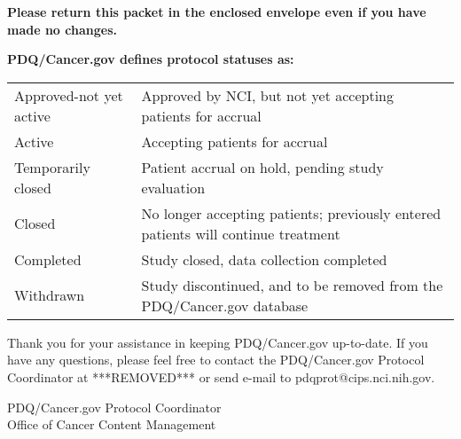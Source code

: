 \documentclass[letterpaper,12pt]{letter}
\begin{document}
\textbf{Please return this packet in the enclosed envelope even if you have
    made no changes.}

\textbf{PDQ/Cancer.gov defines protocol statuses as:}

\begin{longtable}{p{2in}p{4in}}
Approved-not yet active & Approved by NCI, but not yet accepting
                          patients for accrual \\
Active                  & Accepting patients for accrual \\
Temporarily closed      & Patient accrual on hold, pending study evaluation \\
Closed                  & No longer accepting patients; previously entered
                          patients will continue treatment \\
Completed               & Study closed, data collection completed \\
Withdrawn               & Study discontinued, and to be removed from
                          the PDQ/Cancer.gov database
\end{longtable}

Thank you for your assistance in keeping PDQ/Cancer.gov up-to-date.  If you
have any questions, please feel free to contact the PDQ/Cancer.gov Protocol
Coordinator at ***REMOVED*** or send e-mail to pdqprot@cips.nci.nih.gov.

\vspace{12pt}

PDQ/Cancer.gov Protocol Coordinator \\
Office of Cancer Content Management

\vfill
\end{document}
